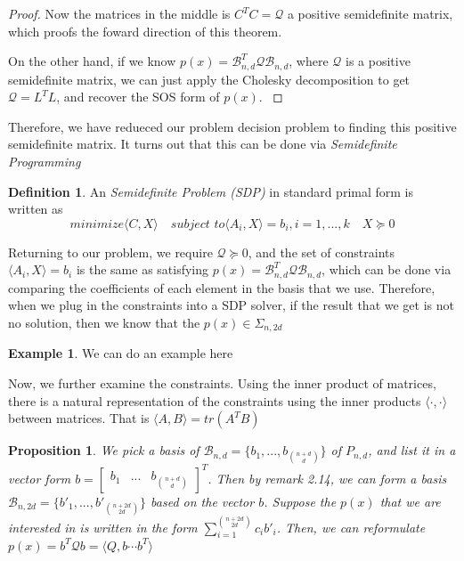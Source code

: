 \documentclass[12pt]{amsart}
\numberwithin{equation}{section}
\newtheorem{prop}[thm]{Proposition}
\theoremstyle{definition}
\newtheorem{definition}[thm]{Definition}
\newtheorem{example}[thm]{Example}
\numberwithin{thm}{section}
\begin{document}
\begin{proof}
     Now the matrices in the middle is $C^T C = \mathcal{Q}$ a positive semidefinite matrix, which proofs the foward direction of this theorem.

     On the other hand, if we know $p(x) = \mathcal{B}_{n, d}^T \mathcal{Q} \mathcal{B}_{n, d}$, where $\mathcal{Q}$ is a positive semidefinite matrix, we can just apply the Cholesky decomposition to get $\mathcal{Q} = L^T L$, and recover the SOS form of $p(x)$. \cite{Blekherman:Parrilo:Thomas}
\end{proof}

\smallskip
Therefore, we have redueced our problem decision problem to finding this positive semidefinite matrix. It turns out that this can be done via \emph{Semidefinite Programming} \cite{Blekherman:Parrilo:Thomas}
\begin{definition}
     \label{def:SDP}
     An \emph{Semidefinite Problem (SDP)} in standard primal form is written as
     \begin{equation}
          \textit{minimize} \langle C, X \rangle \quad \textit{subject to} \langle A_i, X \rangle = b_i, i=1,...,k \quad X \succcurlyeq 0
     \end{equation}
\end{definition}

Returning to our problem, we require $\mathcal{Q} \succcurlyeq 0$, and the set of constraints $ \langle A_i, X \rangle = b_i$ is the same as satisfying $p(x) = \mathcal{B}_{n, d}^T \mathcal{Q} \mathcal{B}_{n, d}$, which can be done via comparing the coefficients of each element in the basis that we use. \cite{Recher:Masterthesis} 
Therefore, when we plug in the constraints into a SDP solver, if the result that we get is not no solution, then we know that the $p(x) \in \Sigma_{n, 2d}$

\begin{example}
     We can do an example here
\end{example}

\smallskip
Now, we further examine the constraints. Using the inner product of matrices, there is a natural representation of the constraints using the inner products $\langle \cdot,  \cdot \rangle$ between matrices. That is $\langle A, B \rangle = tr(A^T B)$ 

\begin{prop}

     We pick a basis of $\mathcal{B}_{n, d} = \{b_1, ..., b_{n + d \choose d}\}$ of $P_{n, d}$, and list it in a vector form $ b =\begin{bmatrix}
          b_1 &
          ... &
          b_{ n+ d \choose d}
     \end{bmatrix} ^ T$. Then by remark 2.14, we can form a basis $\mathcal{B}_{n, 2d} = \{b'_1, ..., b'_{n + 2d \choose 2d}\}$ based on the vector $b$. 
     Suppose the $p(x)$ that we are interested in is written in the form $\sum_{i = 1}^{n + 2d \choose 2d } c_i b'_i$.
     Then, we can reformulate $p(x) = b^T \mathcal{Q} b = \langle Q, b \cdots b^T \rangle$ 
\end{prop}
\end{document}
